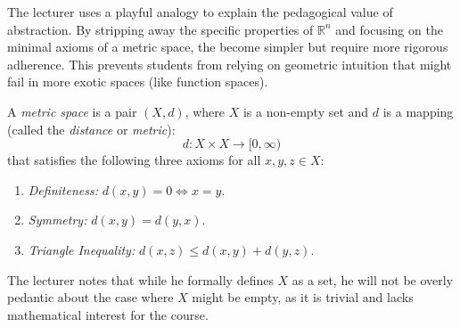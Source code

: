 \begin{didactic-insight}
The lecturer uses a playful analogy to explain the pedagogical value of abstraction. By stripping away the specific properties of $\mathbb{R}^n$ and focusing on the minimal axioms of a metric space, the  become simpler but require more rigorous adherence. This prevents students from relying on geometric intuition that might fail in more exotic spaces (like function spaces).
\end{didactic-insight}

\begin{nice-box}
\begin{definition} \label{def:metric_space}
A \emph{metric space} is a pair $(X, d)$, where $X$ is a non-empty set and $d$ is a mapping (called the \emph{distance} or \emph{metric}):
\[ d: X \times X \to [0, \infty) \]
that satisfies the following three axioms for all $x, y, z \in X$:
\begin{enumerate}
    \setcounter{enumi}{0} \item \emph{Definiteness:} $d(x, y) = 0 \iff x = y$.
    \setcounter{enumi}{1} \item \emph{Symmetry:} $d(x, y) = d(y, x)$.
    \setcounter{enumi}{2} \item \emph{Triangle Inequality:} $d(x, z) \le d(x, y) + d(y, z)$.
\end{enumerate}
\end{definition}

\begin{explanation-of-steps}
The lecturer notes that while he formally defines $X$ as a set, he will not be overly pedantic about the case where $X$ might be empty, as it is trivial and lacks mathematical interest for the course.
\end{explanation-of-steps}
\end{nice-box}

